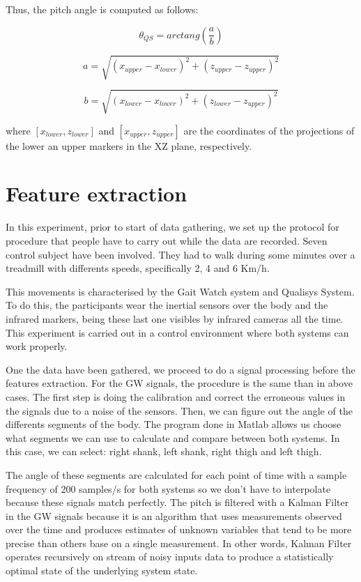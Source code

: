 Thus, the pitch angle is computed as follows:

\begin{equation}
\label{angleQS1}
	\theta_{QS}= arctang(\frac{a}{b})
\end{equation}

\begin{equation}
\label{angleQS2}
	a= \sqrt{(x_{upper}-x_{lower})^{2} + (z_{upper}-z_{upper})^{2} }
\end{equation}

\begin{equation}
\label{angleQS3}
	b= \sqrt{(x_{lower}-x_{lower})^{2} + (z_{lower}-z_{upper})^{2} }
\end{equation}

where $ [x_{lower}, z_{lower} ] $ and $ [x_{upper}, z_{upper} ] $ are the coordinates of the projections of the lower an upper markers in the XZ plane, respectively.

\section{Feature extraction}
In this experiment, prior to start of data gathering, we set up the protocol for procedure that people have to carry out while the data are recorded. Seven control subject have been involved. They had to walk during some minutes over a treadmill with differents speeds, specifically 2, 4 and 6 Km/h.

This movements is characterised by the Gait Watch system and Qualisys System. To do this, the participants wear the inertial sensors over the body and the infrared markers, being these last one visibles by infrared cameras all the time. This experiment is carried out in a control environment where both systems can work properly.

One the data have been gathered, we proceed to do a signal processing before the features extraction. For the GW signals, the procedure is the same than in above cases. The first step is doing the calibration and correct the erroneous values in the signals due to a noise of the sensors.
Then, we can figure out the angle of the differents segments of the body. The program done in Matlab allows us choose what segments we can use to calculate and compare between both systems. In this case, we can select: right shank, left shank, right thigh and left thigh.

The angle of these segments are calculated for each point of time with a sample frequency of 200 samples/s for both systems so we don’t have to interpolate because these signals match perfectly. The pitch is filtered with a Kalman Filter in the GW signals because it is an algorithm that uses measurements observed over the time and produces estimates of unknown variables that tend to be more precise than others base on a single measurement. In other words, Kalman Filter operates recursively on stream of noisy inputs data to produce a statistically optimal state of the underlying system state\cite{KalmanFilter}.

